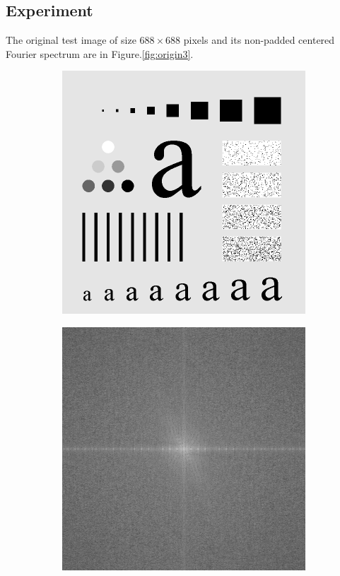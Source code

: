 \subsection{Experiment}
The original test image of size $688 \times 688$ pixels and its non-padded centered Fourier spectrum are in Figure.\ref{fig:origin3}.
\begin{figure}[h!]
	\centering
	\begin{subfigure}[b]{0.45\linewidth}
		\includegraphics[width=\linewidth]{myfigure/p3/characters_test_pattern.png}
		\caption{}
		\label{fig:orig}
	\end{subfigure}
  	\begin{subfigure}[b]{0.45\linewidth}
		\includegraphics[width=\linewidth]{myfigure/p3/spectrum.png}

\end{subfigure}
\end{figure}
